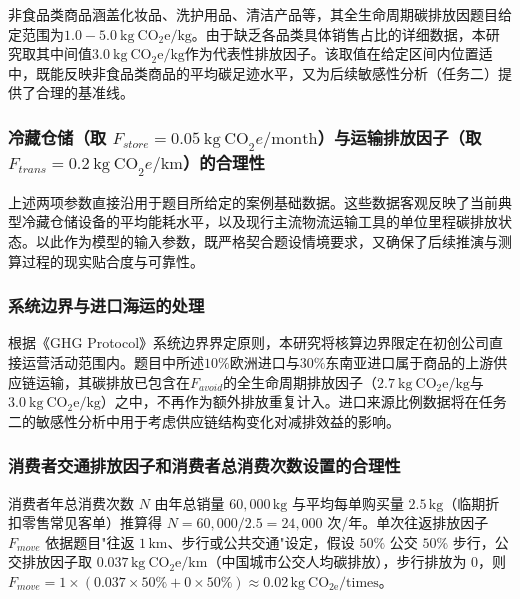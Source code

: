 \documentclass{article}
\begin{document}
非食品类商品涵盖化妆品、洗护用品、清洁产品等，其全生命周期碳排放因题目给定范围为$1.0-5.0\ \mathrm{kg\ CO_2e/kg}$。由于缺乏各品类具体销售占比的详细数据，本研究取其中间值$3.0\ \mathrm{kg\ CO_2e/kg}$作为代表性排放因子。该取值在给定区间内位置适中，既能反映非食品类商品的平均碳足迹水平，又为后续敏感性分析（任务二）提供了合理的基准线。

\subsubsection{冷藏仓储（取 $F_{store} = 0.05\ \mathrm{kg\ CO}_2e/\mathrm{month}$）与运输排放因子（取 $F_{trans} = 0.2\ \mathrm{kg\ CO}_2e/\mathrm{km}$）的合理性}

上述两项参数直接沿用于题目所给定的案例基础数据。这些数据客观反映了当前典型冷藏仓储设备的平均能耗水平，以及现行主流物流运输工具的单位里程碳排放状态。以此作为模型的输入参数，既严格契合题设情境要求，又确保了后续推演与测算过程的现实贴合度与可靠性。

\subsubsection{系统边界与进口海运的处理}

根据《GHG Protocol》系统边界界定原则，本研究将核算边界限定在初创公司直接运营活动范围内。题目中所述$10\%$欧洲进口与$30\%$东南亚进口属于商品的上游供应链运输，其碳排放已包含在$F_{avoid}$的全生命周期排放因子（$2.7\ \mathrm{kg\ CO_2e/kg}$与$3.0\ \mathrm{kg\ CO_2e/kg}$）之中，不再作为额外排放重复计入。进口来源比例数据将在任务二的敏感性分析中用于考虑供应链结构变化对减排效益的影响。

\subsubsection{消费者交通排放因子和消费者总消费次数设置的合理性}

消费者年总消费次数 $N$ 由年总销量 $60{,}000\,\mathrm{kg}$ 与平均每单购买量 $2.5\,\mathrm{kg}$（临期折扣零售常见客单）推算得 $N = 60{,}000 / 2.5 = 24{,}000$ 次/年。单次往返排放因子 $F_{move}$ 依据题目"往返 $1\,\mathrm{km}$、步行或公共交通"设定，假设 $50\%$ 公交 $50\%$ 步行，公交排放因子取 $0.037\,\mathrm{kg\ CO_2e/km}$（中国城市公交人均碳排放），步行排放为 $0$，则 $F_{move} = 1 \times (0.037\times 50\% + 0\times 50\%) \approx 0.02\,\mathrm{kg\ CO_{2e}/times}$。 

\end{document}
